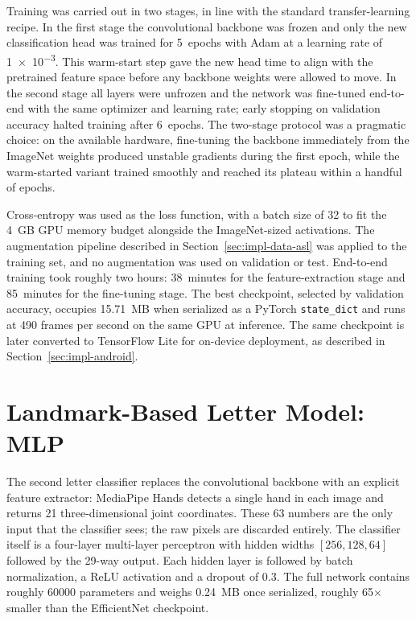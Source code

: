 Training was carried out in two stages, in line with the standard
transfer-learning recipe. In the first stage the convolutional
backbone was frozen and only the new classification head was trained
for 5~epochs with Adam at a learning rate of \num{1e-3}. This
warm-start step gave the new head time to align with the pretrained
feature space before any backbone weights were allowed to move. In
the second stage all layers were unfrozen and the network was
fine-tuned end-to-end with the same optimizer and learning rate;
early stopping on validation accuracy halted training after
6~epochs. The two-stage protocol was a pragmatic choice: on the
available hardware, fine-tuning the backbone immediately from the
ImageNet weights produced unstable gradients during the first epoch,
while the warm-started variant trained smoothly and reached its
plateau within a handful of epochs.

Cross-entropy was used as the loss function, with a batch size of 32
to fit the 4~GB GPU memory budget alongside the ImageNet-sized
activations. The augmentation pipeline described in
Section~\ref{sec:impl-data-asl} was applied to the training set, and
no augmentation was used on validation or test. End-to-end training
took roughly two hours: 38~minutes for the feature-extraction stage
and 85~minutes for the fine-tuning stage. The best checkpoint,
selected by validation accuracy, occupies 15.71~MB when serialized as
a PyTorch \texttt{state\_dict} and runs at \num{490} frames per
second on the same GPU at inference. The same checkpoint is later
converted to TensorFlow Lite for on-device deployment, as described
in Section~\ref{sec:impl-android}.

\section{Landmark-Based Letter Model: MLP}
\label{sec:impl-mlp}

The second letter classifier replaces the convolutional backbone with
an explicit feature extractor: MediaPipe Hands detects a single hand
in each image and returns 21 three-dimensional joint coordinates.
These 63 numbers are the only input that the classifier sees; the
raw pixels are discarded entirely. The classifier itself is a
four-layer multi-layer perceptron with hidden widths $[256, 128,
64]$ followed by the 29-way output. Each hidden layer is followed by
batch normalization, a ReLU activation and a dropout of \num{0.3}.
The full network contains roughly \num{60000} parameters and weighs
0.24~MB once serialized, roughly 65$\times$ smaller than the
EfficientNet checkpoint.

